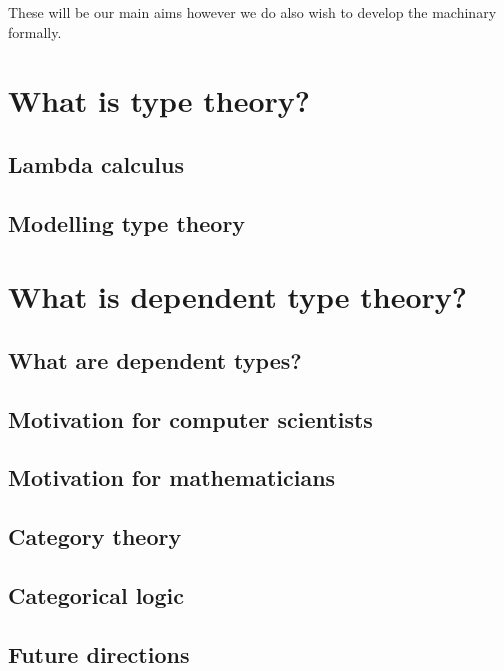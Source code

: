 These will be our main aims however we do also wish to develop the machinary formally.

\section{What is type theory?}

\subsection{Lambda calculus}

\subsection{Modelling type theory}

\section{What is dependent type theory?}

\subsection{What are dependent types?}

\subsection{Motivation for computer scientists}

\subsection{Motivation for mathematicians}

\subsection{Category theory}

\subsection{Categorical logic}

\subsection{Future directions}












